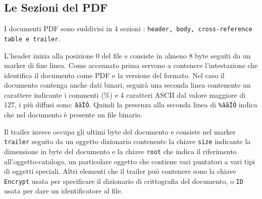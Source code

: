 \subsection{Le Sezioni del PDF}
I documenti PDF sono suddivisi in 4 sezioni : \texttt{header, body, cross-reference table e trailer}.
\par
L'header inizia alla posizione 0 del file e consiste in almeno 8 byte seguiti da un marker di fine linea. Come accennato prima servono a contenere l'intestazione che identifica il documento come PDF e la versione del formato. Nel caso il documento contenga anche dati binari, seguirà una seconda linea contenente un carattere indicante i commenti (\%) e 4 caratteri ASCII dal valore maggiore di 127, i più diffusi sono: \texttt{âãÏÓ}. Quindi la presenza alla seconda linea di \texttt{\%âãÏÓ} indica che nel documento è presente un file binario.
\par
Il trailer invece occupa gli ultimi byte del documento e consiste nel marker \texttt{trailer} seguito da un oggetto dizionario contenente la chiave \texttt{size} indicante la dimensione in byte del documento e la chiave \texttt{root} che indica il riferimento all'oggetto-catalogo, un particolare oggetto che contiene vari puntatori a vari tipi di oggetti speciali.
Altri elementi che il trailer può contenere sono la chiave 	\texttt{Encrypt} usata per specificare il dizionario di crittografia del documento, o \texttt{ID} usata per dare un identificatore al file.





%
%


